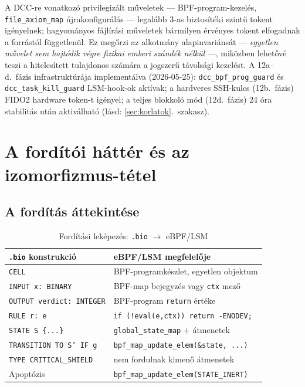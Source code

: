 \documentclass[11pt,a4paper,twoside]{article}
\begin{document}
A DCC-re vonatkozó privilegizált műveletek — BPF-program-kezelés,
\texttt{file\_axiom\_map} újrakonfigurálás — legalább 3-as biztosítéki
szintű tokent igényelnek; hagyományos fájlírási műveletek bármilyen
érvényes tokent elfogadnak a forrástól függetlenül.
Ez megőrzi az alkotmány alapinvariánsát — \emph{egyetlen művelet sem hajtódik
végre fizikai emberi szándék nélkül} —, miközben lehetővé teszi a hitelesített
tulajdonos számára a jogszerű távolsági kezelést.
A 12a--d.\ fázis infrastruktúrája implementálva (2026-05-25):
\texttt{dcc\_bpf\_prog\_guard} és \texttt{dcc\_task\_kill\_guard} LSM-hook-ok aktívak;
a hardveres SSH-kulcs (12b.\ fázis) FIDO2 hardware token-t igényel;
a teljes blokkoló mód (12d.\ fázis) 24 óra stabilitás után aktiválható
(lásd: \ref{sec:korlatok}.\ szakasz).

\section{A fordítói háttér és az izomorfizmus-tétel}

\subsection{A fordítás áttekintése}

\begin{table}[H]
\centering
\caption{Fordítási leképezés: \texttt{.bio} $\to$ eBPF/LSM}
\begin{tabular}{@{}ll@{}}
\toprule
\textbf{\texttt{.bio} konstrukció} & \textbf{eBPF/LSM megfelelője} \\ \midrule
\texttt{CELL} & BPF-programkészlet, egyetlen objektum \\
\texttt{INPUT x: BINARY} & BPF-map bejegyzés vagy \texttt{ctx} mező \\
\texttt{OUTPUT verdict: INTEGER} & BPF-program \texttt{return} értéke \\
\texttt{RULE r: e} & \texttt{if (!eval(e,ctx)) return -ENODEV;} \\
\texttt{STATE S \{...\}} & \texttt{global\_state\_map} + átmenetek \\
\texttt{TRANSITION TO S' IF g} & \texttt{bpf\_map\_update\_elem(\&state, ...)} \\
\texttt{TYPE CRITICAL\_SHIELD} & nem fordulnak kimenő átmenetek \\
Apoptózis & \texttt{bpf\_map\_update\_elem(STATE\_INERT)} \\
\bottomrule
\end{tabular}
\end{table}
\end{document}

